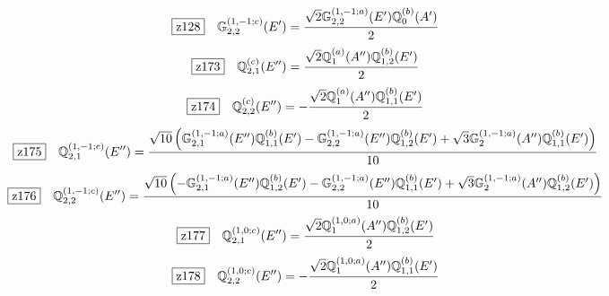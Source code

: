 \documentclass[fleqn,10pt,landscape]{jsarticle}
\begin{document}
\begin{dmath*}
\hspace*{3mm}\fbox{z128}\quad \mathbb{G}_{2,2}^{(1,-1;c)}(E^{\prime})=\frac{\sqrt{2} \mathbb{G}_{2,2}^{(1,-1;a)}(E^{\prime}) \mathbb{Q}_{0}^{(b)}(A^{\prime})}{2}
\end{dmath*}
\begin{dmath*}
\hspace*{3mm}\fbox{z173}\quad \mathbb{Q}_{2,1}^{(c)}(E^{\prime\prime})=\frac{\sqrt{2} \mathbb{Q}_{1}^{(a)}(A^{\prime\prime}) \mathbb{Q}_{1,2}^{(b)}(E^{\prime})}{2}
\end{dmath*}
\begin{dmath*}
\hspace*{3mm}\fbox{z174}\quad \mathbb{Q}_{2,2}^{(c)}(E^{\prime\prime})=- \frac{\sqrt{2} \mathbb{Q}_{1}^{(a)}(A^{\prime\prime}) \mathbb{Q}_{1,1}^{(b)}(E^{\prime})}{2}
\end{dmath*}
\begin{dmath*}
\hspace*{3mm}\fbox{z175}\quad \mathbb{Q}_{2,1}^{(1,-1;c)}(E^{\prime\prime})=\frac{\sqrt{10} \left(\mathbb{G}_{2,1}^{(1,-1;a)}(E^{\prime\prime}) \mathbb{Q}_{1,1}^{(b)}(E^{\prime}) - \mathbb{G}_{2,2}^{(1,-1;a)}(E^{\prime\prime}) \mathbb{Q}_{1,2}^{(b)}(E^{\prime}) + \sqrt{3} \mathbb{G}_{2}^{(1,-1;a)}(A^{\prime\prime}) \mathbb{Q}_{1,1}^{(b)}(E^{\prime})\right)}{10}
\end{dmath*}
\begin{dmath*}
\hspace*{3mm}\fbox{z176}\quad \mathbb{Q}_{2,2}^{(1,-1;c)}(E^{\prime\prime})=\frac{\sqrt{10} \left(- \mathbb{G}_{2,1}^{(1,-1;a)}(E^{\prime\prime}) \mathbb{Q}_{1,2}^{(b)}(E^{\prime}) - \mathbb{G}_{2,2}^{(1,-1;a)}(E^{\prime\prime}) \mathbb{Q}_{1,1}^{(b)}(E^{\prime}) + \sqrt{3} \mathbb{G}_{2}^{(1,-1;a)}(A^{\prime\prime}) \mathbb{Q}_{1,2}^{(b)}(E^{\prime})\right)}{10}
\end{dmath*}
\begin{dmath*}
\hspace*{3mm}\fbox{z177}\quad \mathbb{Q}_{2,1}^{(1,0;c)}(E^{\prime\prime})=\frac{\sqrt{2} \mathbb{Q}_{1}^{(1,0;a)}(A^{\prime\prime}) \mathbb{Q}_{1,2}^{(b)}(E^{\prime})}{2}
\end{dmath*}
\begin{dmath*}
\hspace*{3mm}\fbox{z178}\quad \mathbb{Q}_{2,2}^{(1,0;c)}(E^{\prime\prime})=- \frac{\sqrt{2} \mathbb{Q}_{1}^{(1,0;a)}(A^{\prime\prime}) \mathbb{Q}_{1,1}^{(b)}(E^{\prime})}{2}
\end{dmath*}
\end{document}

